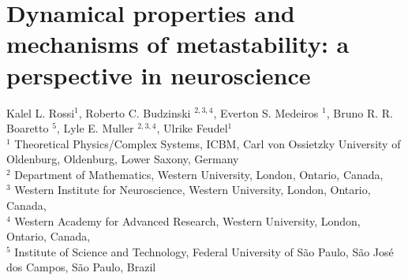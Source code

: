 \chapter{Dynamical properties and mechanisms of metastability: a perspective in neuroscience}


\begin{center}
    {\large Kalel L. Rossi$^{1}$, Roberto C. Budzinski $^{2,3,4}$, Everton S. Medeiros $^{1}$, Bruno R. R. Boaretto $^{5}$, Lyle E. Muller $^{2,3,4}$, Ulrike Feudel$^{1}$ } \\[1em]
    {\small $^1$ Theoretical Physics/Complex Systems, ICBM, Carl von Ossietzky University of Oldenburg, Oldenburg, Lower Saxony, Germany \\ $^2$ Department of Mathematics, Western University, London, Ontario, Canada, \\ $^3$ Western Institute for Neuroscience, Western University, London, Ontario, Canada, \\ $^4$ Western Academy for Advanced Research, Western University, London, Ontario, Canada, \\ $^5$ Institute of Science and Technology, Federal University of São Paulo, São José dos Campos, São Paulo, Brazil}
\end{center}


